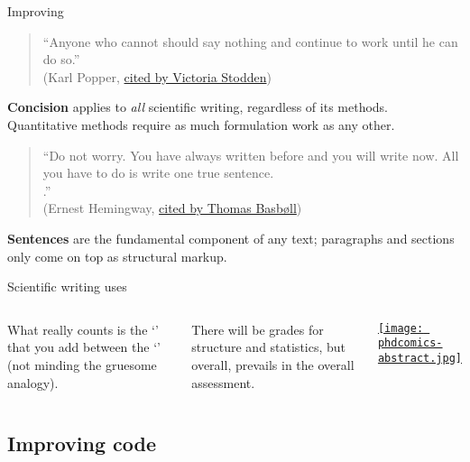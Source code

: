 \documentclass[t]{beamer}
\begin{document}
	\begin{frame}[t]{Improving }

	\begin{quote}``Anyone who cannot  should say nothing and continue to work until he can do so.''\\(Karl Popper, \href{http://blog.stodden.net/2010/02/03/open-data-dead-on-arrival/}{cited by Victoria Stodden})\end{quote}

	\textbf{Concision} applies to \emph{all} scientific writing, regardless of its methods. Quantitative methods require as much formulation work as any other.

	\begin{quote}``Do not worry. You have always written before and you will write now. All you have to do is write one true sentence.\\ .''\\(Ernest Hemingway, \href{http://secondlanguage.blogspot.com/2011/03/can-you-compose-paragraph-in-crisis.html}{cited by Thomas Basbøll})\end{quote}

	\textbf{Sentences} are the fundamental component of any text; paragraphs and sections only come on top as structural markup.

	\end{frame}
	
	\begin{frame}[t]{Scientific writing uses }

		\begin{columns}[T]
			What really counts is the `' that you add between the `' (not minding the gruesome analogy).\vspace{1em}
			
			There will be grades for structure and statistics, but overall,  prevails in the overall assessment.
			
			\href{http://www.phdcomics.com/comics.php?f=1121}{\texttt{[image: phdcomics-abstract.jpg]}}
		\end{columns}

	\end{frame}
	
	\subsection{Improving code}
	
\end{document}
